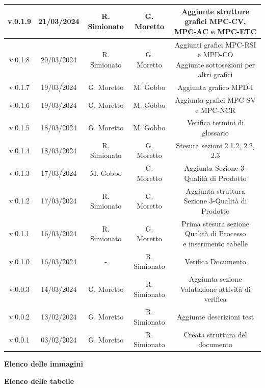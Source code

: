\documentclass[5pt]{article}
\begin{document}
\begin{table}[H]
{\begin{tabular}{|c|c|c|c|c|}
				\hline
				v.0.1.9 & 21/03/2024 & R. Simionato & G. Moretto & Aggiunte strutture grafici MPC-CV, MPC-AC e MPC-ETC \\
				\hline
				v.0.1.8 & 20/03/2024 & R. Simionato & G. Moretto & \shortstack{Aggiunti grafici MPC-RSI e MPD-CO\\Aggiunte sottosezioni per altri grafici} \\
				\hline
				v.0.1.7 & 19/03/2024 & G. Moretto & M. Gobbo & Aggiunta grafico MPD-I \\
				\hline
				v.0.1.6 & 19/03/2024 & G. Moretto & M. Gobbo & Aggiunta grafici MPC-SV e MPC-NCR \\
				\hline
				v.0.1.5 & 18/03/2024 & G. Moretto & M. Gobbo & Verifica termini di glossario \\
				\hline
				v.0.1.4 & 18/03/2024 & R. Simionato & G. Moretto & Stesura sezioni 2.1.2, 2.2, 2.3 \\
				\hline
				v.0.1.3 & 17/03/2024 & M. Gobbo & G. Moretto & Aggiunta Sezione 3-Qualità di Prodotto \\
				\hline
				v.0.1.2 & 17/03/2024 & R. Simionato & G. Moretto & Aggiunta struttura Sezione 3-Qualità di Prodotto \\
				\hline
				v.0.1.1 & 16/03/2024 & R. Simionato & G. Moretto & \shortstack{Prima stesura sezione Qualità di Processo\\e inserimento tabelle} \\
				\hline
				v.0.1.0 & 16/03/2024 & - & R. Simionato & Verifica Documento \\
				\hline
				v.0.0.3 & 14/03/2024 & G. Moretto & R. Simionato & Aggiunta sezione Valutazione attività di verifica \\
				\hline
				v.0.0.2 & 13/02/2024 & G. Moretto & R. Simionato  &  Aggiunte descrizioni test\\
				\hline
				v.0.0.1 & 03/02/2024 & G. Moretto & R. Simionato  & Creata struttura del documento \\
				\hline
	   		\end{tabular}
		}
	 	\label{tab:conference}
    \end{table}

	\pagebreak
	\tableofcontents
	\pagebreak

	\textbf{\Large Elenco delle immagini} \\
	\makeatletter
	\makeatother
	
	\pagebreak
	\textbf{\Large Elenco delle tabelle} \\
	\makeatletter
	\makeatother
	
\end{document}
